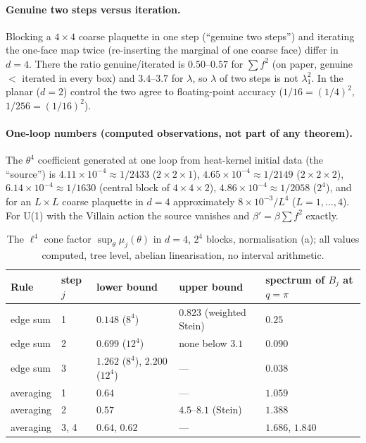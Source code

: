 \documentclass[11pt,a4paper]{article}
\theoremstyle{definition}
\theoremstyle{remark}
\begin{document}
\paragraph{Genuine two steps versus iteration.}
Blocking a $4\times4$ coarse plaquette in one step (``genuine two steps'') and iterating the one-face map twice (re-inserting the marginal of one coarse face) differ in $d=4$. There the ratio genuine/iterated is $0.50$--$0.57$ for $\sum f^2$ (on paper, genuine $<$ iterated in every box) and $3.4$--$3.7$ for $\lambda$, so $\lambda$ of two steps is not $\lambda_1^2$. In the planar ($d=2$) control the two agree to floating-point accuracy ($1/16=(1/4)^2$, $1/256=(1/16)^2$).

\paragraph{One-loop numbers (computed observations, not part of any theorem).}
The $\theta^4$ coefficient generated at one loop from heat-kernel initial data (the ``source'') is $4.11\times10^{-4}\approx1/2433$ ($2\times2\times1$), $4.65\times10^{-4}\approx1/2149$ ($2\times2\times2$), $6.14\times10^{-4}\approx1/1630$ (central block of $4\times4\times2$), $4.86\times10^{-4}\approx1/2058$ ($2^4$), and for an $L\times L$ coarse plaquette in $d=4$ approximately $8\times10^{-3}/L^4$ ($L=1,\dots,4$). For U(1) with the Villain action the source vanishes and $\beta'=\beta\sum f^2$ exactly.

\begin{table}[h]\centering\small
\caption{The $\ell^4$ cone factor $\sup_\theta\mu_j(\theta)$ in $d=4$, $2^4$ blocks, normalisation (a); all values computed, tree level, abelian linearisation, no interval arithmetic.}\label{tab:cone}
\begin{tabular}{@{}lllll@{}}
\toprule
Rule & step $j$ & lower bound & upper bound & spectrum of $B_j$ at $q=\pi$\\ \midrule
edge sum & 1 & $0.148$ ($8^4$) & $0.823$ (weighted Stein) & $0.25$\\
edge sum & 2 & $0.699$ ($12^4$) & none below $3.1$ & $0.090$\\
edge sum & 3 & $1.262$ ($8^4$), $2.200$ ($12^4$) & --- & $0.038$\\
averaging & 1 & $0.64$ & --- & $1.059$\\
averaging & 2 & $0.57$ & $4.5$--$8.1$ (Stein) & $1.388$\\
averaging & 3, 4 & $0.64$, $0.62$ & --- & $1.686$, $1.840$\\
\bottomrule
\end{tabular}
\end{table}
\end{document}

